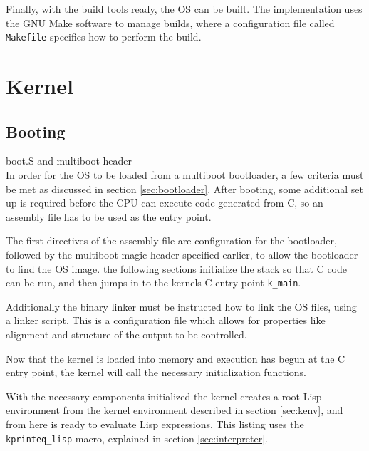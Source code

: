 \documentclass[10pt]{report}
\begin{document}
Finally, with the build tools ready, the OS can be built. The implementation uses the GNU Make software to manage builds, where a configuration file called \texttt{Makefile} specifies how to perform the build.



\section{Kernel}
\subsection{Booting}
boot.S and multiboot header \\
In order for the OS to be loaded from a multiboot bootloader, a few criteria must be met as discussed in section \ref{sec:bootloader}. After booting, some additional set up is required before the CPU can execute code generated from C, so an assembly file has to be used as the entry point.



The first directives of the assembly file are configuration for the bootloader, followed by the multiboot magic header specified earlier, to allow the bootloader to find the OS image. the following sections initialize the stack so that C code can be run, and then jumps in to the kernels C entry point \texttt{k_main}.

Additionally the binary linker must be instructed how to link the OS files, using a linker script. This is a configuration file which allows for properties like alignment and structure of the output to be controlled.



Now that the kernel is loaded into memory and execution has begun at the C entry point, the kernel will call the necessary initialization functions. 



With the necessary components initialized the kernel creates a root Lisp environment from the kernel environment described in section \ref{sec:kenv}, and from here is ready to evaluate Lisp expressions. This listing uses the \texttt{kprinteq_lisp} macro, explained in section \ref{sec:interpreter}.
\end{document}
